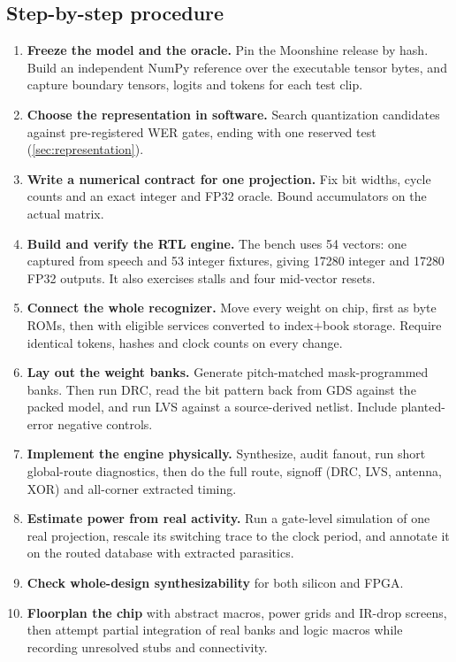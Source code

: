 \subsection{Step-by-step procedure}
\begin{enumerate}
\item \textbf{Freeze the model and the oracle.} Pin the Moonshine release by hash. Build an independent NumPy reference over the executable tensor bytes, and capture boundary tensors, logits and tokens for each test clip.
\item \textbf{Choose the representation in software.} Search quantization candidates against pre-registered WER gates, ending with one reserved test (\cref{sec:representation}).
\item \textbf{Write a numerical contract for one projection.} Fix bit widths, cycle counts and an exact integer and FP32 oracle. Bound accumulators on the actual matrix.
\item \textbf{Build and verify the RTL engine.} The bench uses 54 vectors: one captured from speech and 53 integer fixtures, giving \num{17280} integer and \num{17280} FP32 outputs. It also exercises stalls and four mid-vector resets.
\item \textbf{Connect the whole recognizer.} Move every weight on chip, first as byte ROMs, then with eligible services converted to index$+$book storage. Require identical tokens, hashes and clock counts on every change.
\item \textbf{Lay out the weight banks.} Generate pitch-matched mask-programmed banks. Then run DRC, read the bit pattern back from GDS against the packed model, and run LVS against a source-derived netlist. Include planted-error negative controls.
\item \textbf{Implement the engine physically.} Synthesize, audit fanout, run short global-route diagnostics, then do the full route, signoff (DRC, LVS, antenna, XOR) and all-corner extracted timing.
\item \textbf{Estimate power from real activity.} Run a gate-level simulation of one real projection, rescale its switching trace to the clock period, and annotate it on the routed database with extracted parasitics.
\item \textbf{Check whole-design synthesizability} for both silicon and FPGA.
\item \textbf{Floorplan the chip} with abstract macros, power grids and IR-drop screens, then attempt partial integration of real banks and logic macros while recording unresolved stubs and connectivity.
\end{enumerate}

